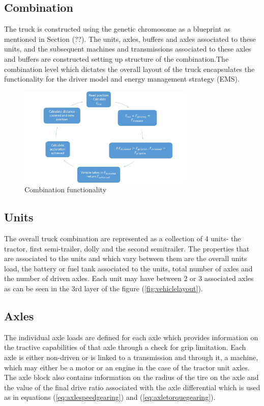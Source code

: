 \documentclass[ExampleMasters.tex]{subfiles}
\begin{document}
\subsection{Combination}\label{sec:combinationstructure}
The truck is constructed using the genetic chromosome as a blueprint as mentioned in Section (??). The units, axles, buffers and axles associated to these units, and the subsequent machines and transmissions associated to these axles and buffers are constructed setting up structure of the combination.The combination level which dictates the overall layout of the truck encapsulates the functionality for the driver model and energy management strategy (EMS).

\begin{figure}
	\begin{center}
		\includegraphics[width=0.75\textwidth]{figures/VehicleModel/combinationfunction.jpg}
	\end{center}
	\caption{Combination functionality}
	\label{fig:combinationfunction}
\end{figure}

\subsection{Units}\label{sec:unitstructure}
The overall truck combination are represented as a collection of 4 units- the tractor, first semi-trailer, dolly and the second semitrailer. The properties that are associated to the units and which vary between them are the overall units load, the battery or fuel tank associated to the units, total number of axles and the number of driven axles. Each unit may have between 2 or 3 associated axles as can be seen in the 3rd layer of the figure (\ref{fig:vehiclelayout}). 

\subsection{Axles}\label{sec:axlestructure}
The individual axle loads are defined for each axle which provides information on the tractive capabilities of that axle through a check for grip limitation. Each axle is either non-driven or is linked to a transmission and through it, a machine, which may either be a motor or an engine in the case of the tractor unit axles. The axle block also contains information on the radius of the tire on the axle and the value of the final drive ratio associated with the axle differential which is used as in equations (\ref{eq:axlespeedgearing}) and (\ref{eq:axletorquegearing}).
\end{document}

